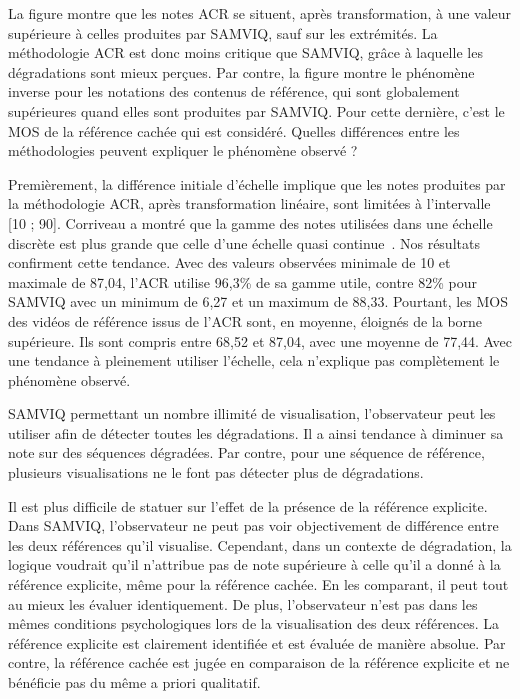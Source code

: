 La figure montre que les notes ACR se situent, après transformation, à une valeur supérieure à celles produites par SAMVIQ, sauf sur les extrémités. La méthodologie ACR est donc moins critique que SAMVIQ, grâce à laquelle les dégradations sont mieux perçues. Par contre, la figure montre le phénomène inverse pour les notations des contenus de référence, qui sont globalement supérieures quand elles sont produites par SAMVIQ. Pour cette dernière, c'est le MOS de la référence cachée qui est considéré. Quelles différences entre les méthodologies peuvent expliquer le phénomène observé ?

Premièrement, la différence initiale d'échelle implique que les notes produites par la méthodologie ACR, après transformation linéaire, sont limitées à l'intervalle [10 ; 90]. Corriveau a montré que la gamme des notes utilisées dans une échelle discrète est plus grande que celle d'une échelle quasi continue~\cite{corriveau-subjScales}. Nos résultats confirment cette tendance. Avec des valeurs observées minimale de 10 et maximale de 87,04, l'ACR utilise 96,3\% de sa gamme utile, contre 82\% pour SAMVIQ avec un minimum de 6,27 et un maximum de 88,33. Pourtant, les MOS des vidéos de référence issus de l'ACR sont, en moyenne, éloignés de la borne supérieure. Ils sont compris entre 68,52 et 87,04, avec une moyenne de 77,44. Avec une tendance à pleinement utiliser l'échelle, cela n'explique pas complètement le phénomène observé.

SAMVIQ permettant un nombre illimité de visualisation, l'observateur peut les utiliser afin de détecter toutes les dégradations. Il a ainsi tendance à diminuer sa note sur des séquences dégradées. Par contre, pour une séquence de référence, plusieurs visualisations ne le font pas détecter plus de dégradations.

Il est plus difficile de statuer sur l'effet de la présence de la référence explicite. Dans SAMVIQ, l'observateur ne peut pas voir objectivement de différence entre les deux références qu'il visualise. Cependant, dans un contexte de dégradation, la logique voudrait qu'il n'attribue pas de note supérieure à celle qu'il a donné à la référence explicite, même pour la référence cachée. En les comparant, il peut tout au mieux les évaluer identiquement. De plus, l'observateur n'est pas dans les mêmes conditions psychologiques lors de la visualisation des deux références. La référence explicite est clairement identifiée et est évaluée de manière absolue. Par contre, la référence cachée est jugée en comparaison de la référence explicite et ne bénéficie pas du même a priori qualitatif. %


